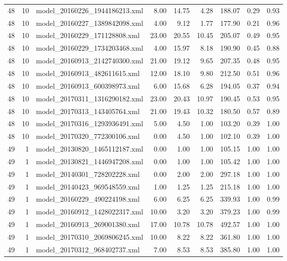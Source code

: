 \begin{table}[ht]
\begin{tabular}{rrlrrrrrr}
   48 &  10 & model\_20160226\_1944186213.xml & 8.00 & 14.75 & 4.28 & 188.07 & 0.29 & 0.93 \\ 
   48 &  10 & model\_20160227\_1389842098.xml & 4.00 & 9.12 & 1.77 & 177.90 & 0.21 & 0.96 \\ 
   48 &  10 & model\_20160229\_171128808.xml & 23.00 & 20.55 & 10.45 & 205.07 & 0.49 & 0.95 \\ 
   48 &  10 & model\_20160229\_1734203468.xml & 4.00 & 15.97 & 8.18 & 190.90 & 0.45 & 0.88 \\ 
   48 &  10 & model\_20160913\_2142740300.xml & 21.00 & 19.12 & 9.65 & 207.35 & 0.48 & 0.95 \\ 
   48 &  10 & model\_20160913\_482611615.xml & 12.00 & 18.10 & 9.80 & 212.50 & 0.51 & 0.96 \\ 
   48 &  10 & model\_20160913\_600398973.xml & 6.00 & 15.68 & 6.28 & 194.05 & 0.37 & 0.94 \\ 
   48 &  10 & model\_20170311\_1316290182.xml & 23.00 & 20.43 & 10.97 & 190.45 & 0.53 & 0.95 \\ 
   48 &  10 & model\_20170313\_143405764.xml & 21.00 & 19.43 & 10.32 & 180.50 & 0.57 & 0.89 \\ 
   48 &  10 & model\_20170316\_1293936491.xml & 5.00 & 4.50 & 1.00 & 103.20 & 0.39 & 1.00 \\ 
   48 &  10 & model\_20170320\_772300106.xml & 0.00 & 4.50 & 1.00 & 102.10 & 0.39 & 1.00 \\ 
   49 &   1 & model\_20130820\_1465112187.xml & 0.00 & 1.00 & 1.00 & 105.15 & 1.00 & 1.00 \\ 
   49 &   1 & model\_20130821\_1446947208.xml & 0.00 & 1.00 & 1.00 & 105.42 & 1.00 & 1.00 \\ 
   49 &   1 & model\_20140301\_728202228.xml & 0.00 & 2.00 & 2.00 & 297.18 & 1.00 & 1.00 \\ 
   49 &   1 & model\_20140423\_969548559.xml & 1.00 & 1.25 & 1.25 & 215.18 & 1.00 & 1.00 \\ 
   49 &   1 & model\_20160229\_490224198.xml & 6.00 & 6.25 & 6.25 & 339.93 & 1.00 & 0.99 \\ 
   49 &   1 & model\_20160912\_1428022317.xml & 10.00 & 3.20 & 3.20 & 379.23 & 1.00 & 0.99 \\ 
   49 &   1 & model\_20160913\_269001380.xml & 17.00 & 10.78 & 10.78 & 492.57 & 1.00 & 1.00 \\ 
   49 &   1 & model\_20170310\_2069806245.xml & 10.00 & 8.22 & 8.22 & 361.80 & 1.00 & 1.00 \\ 
   49 &   1 & model\_20170312\_968402737.xml & 7.00 & 8.53 & 8.53 & 385.80 & 1.00 & 1.00 \\ 

\end{tabular}
\end{table}
